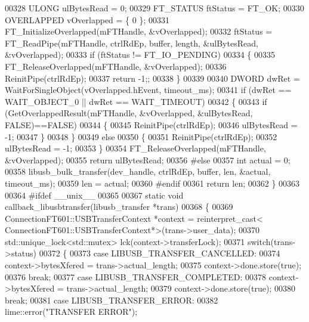 \begin{DoxyCode}
{{{00328     ULONG ulBytesRead = 0;
00329     FT_STATUS ftStatus = FT_OK;
00330     OVERLAPPED  vOverlapped = \{ 0 \};
00331     FT\_InitializeOverlapped(mFTHandle, &vOverlapped);
00332     ftStatus = FT\_ReadPipe(mFTHandle, ctrlRdEp, buffer, length, &ulBytesRead, &vOverlapped);
00333     \textcolor{keywordflow}{if} (ftStatus != FT_IO_PENDING)
00334     \{
00335         FT\_ReleaseOverlapped(mFTHandle, &vOverlapped);
00336         ReinitPipe(ctrlRdEp);
00337         \textcolor{keywordflow}{return} -1;;
00338     \}
00339 
00340     DWORD dwRet = WaitForSingleObject(vOverlapped.hEvent, timeout\_ms);
00341     \textcolor{keywordflow}{if} (dwRet == WAIT\_OBJECT\_0 || dwRet == WAIT\_TIMEOUT)
00342     \{
00343         \textcolor{keywordflow}{if} (GetOverlappedResult(mFTHandle, &vOverlapped, &ulBytesRead, FALSE)==FALSE)
00344         \{
00345             ReinitPipe(ctrlRdEp);
00346             ulBytesRead = -1;
00347         \}
00348     \}
00349     \textcolor{keywordflow}{else}
00350     \{
00351         ReinitPipe(ctrlRdEp);
00352         ulBytesRead = -1;
00353     \}
00354     FT\_ReleaseOverlapped(mFTHandle, &vOverlapped);
00355     \textcolor{keywordflow}{return} ulBytesRead;
00356 \textcolor{preprocessor}{#else}
00357     \textcolor{keywordtype}{int} actual = 0;
00358     libusb\_bulk\_transfer(dev\_handle, ctrlRdEp, buffer, len, &actual, timeout\_ms);
00359     len = actual;
00360 \textcolor{preprocessor}{#endif}
00361     \textcolor{keywordflow}{return} len;
00362 \}
00363 
00364 \textcolor{preprocessor}{#ifdef \_\_unix\_\_}
00365 
00367 \textcolor{keyword}{static} \textcolor{keywordtype}{void} callback\_libusbtransfer(libusb\_transfer *trans)
00368 \{
00369     ConnectionFT601::USBTransferContext *context = \textcolor{keyword}{reinterpret\_cast<}
      ConnectionFT601::USBTransferContext*\textcolor{keyword}{>}(trans->user\_data);
00370     std::unique\_lock<std::mutex> lck(context->transferLock);
00371     \textcolor{keywordflow}{switch}(trans->status)
00372     \{
00373         \textcolor{keywordflow}{case} LIBUSB\_TRANSFER\_CANCELLED:
00374             context->bytesXfered = trans->actual\_length;
00375             context->done.store(\textcolor{keyword}{true});
00376             \textcolor{keywordflow}{break};
00377         \textcolor{keywordflow}{case} LIBUSB\_TRANSFER\_COMPLETED:
00378             context->bytesXfered = trans->actual\_length;
00379             context->done.store(\textcolor{keyword}{true});
00380             \textcolor{keywordflow}{break};
00381         \textcolor{keywordflow}{case} LIBUSB\_TRANSFER\_ERROR:
00382             lime::error(\textcolor{stringliteral}{"TRANSFER ERROR"});
}}}
\end{DoxyCode}
